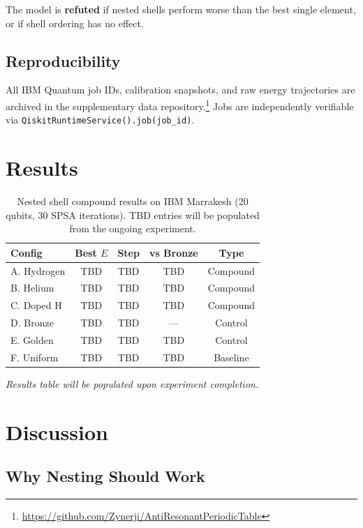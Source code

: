 \documentclass[twocolumn,showpacs,preprintnumbers,amsmath,amssymb,aps,prl]{revtex4-2}
\begin{document}
The model is \textbf{refuted} if nested shells perform worse than the best single element, or if shell ordering has no effect.

\subsection{Reproducibility}

All IBM Quantum job IDs, calibration snapshots, and raw energy trajectories are archived in the supplementary data repository.\footnote{\url{https://github.com/Zynerji/AntiResonantPeriodicTable}} Jobs are independently verifiable via \texttt{QiskitRuntimeService().job(job\_id)}.


\section{Results}
\label{sec:results}

\begin{table}[h]
\centering
\caption{Nested shell compound results on IBM Marrakesh (20 qubits, 30 SPSA iterations). TBD entries will be populated from the ongoing experiment.}
\label{tab:results}
\begin{tabular}{lcccc}
\toprule
\textbf{Config} & \textbf{Best $E$} & \textbf{Step} & \textbf{vs Bronze} & \textbf{Type} \\
\midrule
A. Hydrogen & TBD & TBD & TBD & Compound \\
B. Helium & TBD & TBD & TBD & Compound \\
C. Doped H & TBD & TBD & TBD & Compound \\
\midrule
D. Bronze & TBD & TBD & --- & Control \\
E. Golden & TBD & TBD & TBD & Control \\
F. Uniform & TBD & TBD & TBD & Baseline \\
\bottomrule
\end{tabular}
\end{table}

\textit{Results table will be populated upon experiment completion.}


\section{Discussion}
\label{sec:discussion}

\subsection{Why Nesting Should Work}
\end{document}
